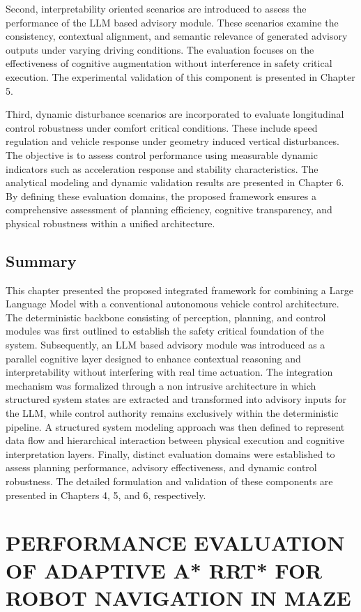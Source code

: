 \documentclass[a4paper,12pt,one side]{report}
\theoremstyle{definition}
\begin{document}
\begin{itemize}
Second, interpretability oriented scenarios are introduced to assess the performance of the LLM based advisory module. These scenarios examine the consistency, contextual alignment, and semantic relevance of generated advisory outputs under varying driving conditions. The evaluation focuses on the effectiveness of cognitive augmentation without interference in safety critical execution. The experimental validation of this component is presented in Chapter 5.

Third, dynamic disturbance scenarios are incorporated to evaluate longitudinal control robustness under comfort critical conditions. These include speed regulation and vehicle response under geometry induced vertical disturbances. The objective is to assess control performance using measurable dynamic indicators such as acceleration response and stability characteristics. The analytical modeling and dynamic validation results are presented in Chapter 6.
By defining these evaluation domains, the proposed framework ensures a comprehensive assessment of planning efficiency, cognitive transparency, and physical robustness within a unified architecture.
\section{Summary}
This chapter presented the proposed integrated framework for combining a Large Language Model with a conventional autonomous vehicle control architecture. The deterministic backbone consisting of perception, planning, and control modules was first outlined to establish the safety critical foundation of the system. Subsequently, an LLM based advisory module was introduced as a parallel cognitive layer designed to enhance contextual reasoning and interpretability without interfering with real time actuation.
The integration mechanism was formalized through a non intrusive architecture in which structured system states are extracted and transformed into advisory inputs for the LLM, while control authority remains exclusively within the deterministic pipeline. A structured system modeling approach was then defined to represent data flow and hierarchical interaction between physical execution and cognitive interpretation layers.
Finally, distinct evaluation domains were established to assess planning performance, advisory effectiveness, and dynamic control robustness. The detailed formulation and validation of these components are presented in Chapters 4, 5, and 6, respectively.
\chapter{PERFORMANCE EVALUATION OF ADAPTIVE A* RRT* FOR ROBOT NAVIGATION IN MAZE}


\end{itemize}
\end{document}
